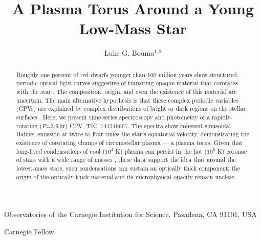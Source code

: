 \documentclass{nature3}
\title{A Plasma Torus Around a Young Low-Mass Star}
\newcommand{\carnegie}{Observatories of the Carnegie Institution for Science, Pasadena, CA 91101, USA}
\begin{document}
\author{Luke G. Bouma$^{1,2}$}

\maketitle

\scriptsize
\begin{affiliations}
\item \carnegie
\item Carnegie Fellow
\end{affiliations}
\normalsize


\begin{abstract}
\normalfont
Roughly one percent of red dwarfs younger than 100 million years show
structured, periodic optical light curves suggestive of transiting
opaque material that corotates with the star
\cite{Rebull2016,Stauffer2017,Rebull2018,Bouma2024}.  The
composition, origin, and even the existence of this material are
uncertain. The main alternative hypothesis is that these complex
periodic variables (CPVs) are explained by complex distributions of
bright or dark regions on the stellar surfaces \cite{Koen2021}.
Here, we present time-series spectroscopy and photometry of a
rapidly-rotating ($P$=3.9\,hr) CPV, TIC~141146667. The spectra show
coherent sinusoidal Balmer emission at twice to four times the
star's equatorial velocity, demonstrating the existence of
corotating clumps of circumstellar plasma --- a plasma torus.  Given
that long-lived condensations of cool ($10^4$ K) plasma can persist
in the hot ($10^6$ K) coronae of stars with a wide range of masses
\cite{CollierCameron1989,Townsend2005,Dunstone2006,Petit2013,Waugh2022,Daley-Yates2024},
these data support the idea that around the lowest-mass stars, such
condensations can sustain an optically thick component; the origin
of the optically thick material and its microphysical opacity remain
unclear.
\end{abstract}

\maketitle

\end{document}
